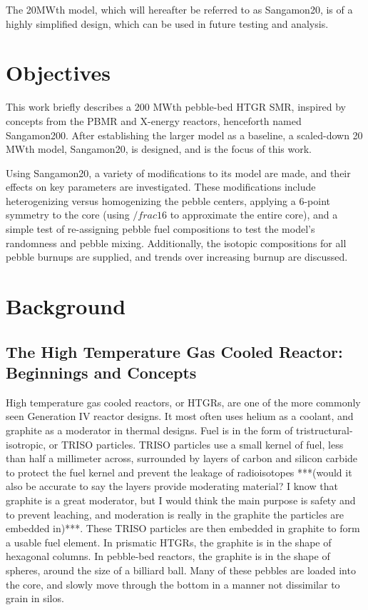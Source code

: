 The 20MWth model, which will hereafter be referred to as Sangamon20, is of a highly simplified design, which can be used in future testing and analysis.



\section{Objectives}

This work briefly describes a 200 MWth pebble-bed HTGR SMR, inspired by concepts from the PBMR and X-energy reactors, henceforth named Sangamon200.  After establishing the larger model as a baseline, a scaled-down 20 MWth model, Sangamon20, is designed, and is the focus of this work.

Using Sangamon20, a variety of modifications to its model are made, and their effects on key parameters are investigated.  These modifications include heterogenizing versus homogenizing the pebble centers, applying a 6-point symmetry to the core (using $/frac{1}{6}$ to approximate the entire core), and a simple test of re-assigning pebble fuel compositions to test the model's randomness and pebble mixing.  Additionally, the isotopic compositions for all pebble burnups are supplied, and trends over increasing burnup are discussed.

\section{Background}
\subsection{The High Temperature Gas Cooled Reactor: Beginnings and Concepts}

High temperature gas cooled reactors, or HTGRs, are one of the more commonly seen Generation IV reactor designs.  It most often uses helium as a coolant, and graphite as a moderator in thermal designs.  Fuel is in the form of tristructural-isotropic, or TRISO particles.  TRISO particles use a small kernel of fuel, less than half a millimeter across, surrounded by layers of carbon and silicon carbide to protect the fuel kernel and prevent the leakage of radioisotopes ***(would it also be accurate to say the layers provide moderating material?  I know that graphite is a great moderator, but I would think the main purpose is safety and to prevent leaching, and moderation is really in the graphite the particles are embedded in)***.  These TRISO particles are then embedded in graphite to form a usable fuel element.  In prismatic HTGRs, the graphite is in the shape of hexagonal columns.  In pebble-bed reactors, the graphite is in the shape of spheres, around the size of a billiard ball.  Many of these pebbles are loaded into the core, and slowly move through the bottom in a manner not dissimilar to grain in silos.

